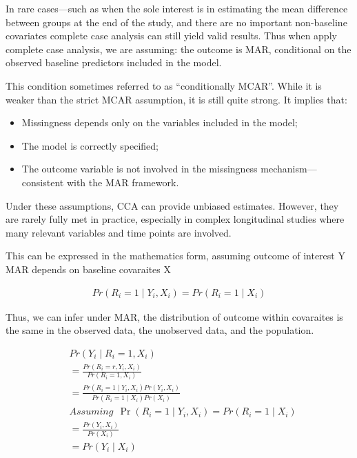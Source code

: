 \documentclass{article}
\providecommand{\tightlist}{%
  \setlength{\itemsep}{0pt}\setlength{\parskip}{0pt}}
\begin{document}
In rare cases---such as when the sole interest is in estimating the mean
difference between groups at the end of the study, and there are no
important non-baseline covariates complete case analysis can still yield
valid results. Thus when apply complete case analysis, we are assuming:
the outcome is MAR, conditional on the observed baseline predictors
included in the model.

This condition sometimes referred to as ``conditionally MCAR''. While it
is weaker than the strict MCAR assumption, it is still quite strong. It
implies that:

\begin{itemize}
\tightlist
\item
  Missingness depends only on the variables included in the model;
\item
  The model is correctly specified;
\item
  The outcome variable is not involved in the missingness
  mechanism---consistent with the MAR framework.
\end{itemize}

Under these assumptions, CCA can provide unbiased estimates. However,
they are rarely fully met in practice, especially in complex
longitudinal studies where many relevant variables and time points are
involved.

This can be expressed in the mathematics form, assuming outcome of
interest Y MAR depends on baseline covaraites X

\begin{align*}
  Pr(R_i=1 \mid Y_i, X_i) = Pr(R_i=1 \mid X_i)
  \end{align*}

Thus, we can infer under MAR, the distribution of outcome within
covaraites is the same in the observed data, the unobserved data, and
the population.

\begin{align*}
  & Pr(Y_i \mid R_i=1, X_i) \\ 
  & = \displaystyle \frac{Pr(R_i=r,Y_i,X_i)}{Pr(R_i=1,X_i)} \\
  & = \displaystyle \frac{Pr(R_i=1 \mid Y_i,X_i)Pr(Y_i,X_i)}{Pr(R_i=1 \mid X_i)Pr(X_i)} 
  \\
  & Assuming \ \ \Pr(R_i=1 \mid Y_i, X_i) = Pr(R_i=1 \mid X_i) \\
  & = \displaystyle \frac{Pr(Y_i,X_i)}{Pr(X_i)} \\
  & = Pr(Y_i \mid X_i)
  \end{align*}
\end{document}
